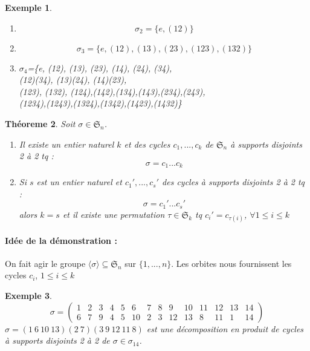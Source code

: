 \documentclass[a4paper, oneside]{report}
\theoremstyle{break}
\newtheorem{thm}{Théoreme}[section] %
\newtheorem{exem}[thm]{Exemple}
\renewcommand{\S}{\mathfrak{S}}
\begin{document}
\begin{exem}
	\begin{enumerate}
		\item $$\sigma_2=\{e, (12)\}$$
		\item $$\sigma_3=\{e, (12), (13), (23), (123), (132)\}$$
		\item
		\begin{center}
			$\sigma_4$=\{e, (12), (13), (23), (14), (24), (34),\\
			(12)(34), (13)(24), (14)(23),\\
			(123), (132), (124),(142),(134),(143),(234),(243),\\
			(1234),(1243),(1324),(1342),(1423),(1432)\}
		\end{center} 
	\end{enumerate}
\end{exem}

\begin{thm}
	Soit $\sigma\in \S_n$.
	\begin{enumerate}
		\item Il existe un entier naturel $k$ et des cycles $c_1,...,c_k$ de $\S_n$ à supports disjoints 2 à 2 tq :
		$$\sigma = c_1...c_k$$
		
		\item Si $s$ est un entier naturel et $c_1',...,c_s'$ des cycles à supports disjoints 2 à 2 tq :
		$$\sigma = c_1'...c_s'$$
		alors $k=s$ et il existe une permutation $\tau \in \S_k$ tq $c_i'=c_{\tau(i)}$, $\forall 1\leq i \leq k$
	\end{enumerate}
\end{thm}

\paragraph{Idée de la démonstration :}
On fait agir le groupe $\langle\sigma\rangle \subseteq \S_n$ sur $\{1,...,n\}$. Les orbites nous fournissent les cycles $c_i$, $1\leq i \leq k$

\begin{exem}
	$$\sigma = \left(\begin{array}{llllllllllllll}
	1&2&3&4&5&6&7&8&9&10&11&12&13&14\\
	6&7&9&4&5&10&2&3&12&13&8&11&1&14
	\end{array}\right)$$
	$\sigma = (1~6~10~13)(2~7)(3~9~12~11~8)$ est une décomposition en produit de cycles à supports disjoints 2 à 2 de $\sigma \in \sigma_{14}$.
\end{exem}
\end{document}
